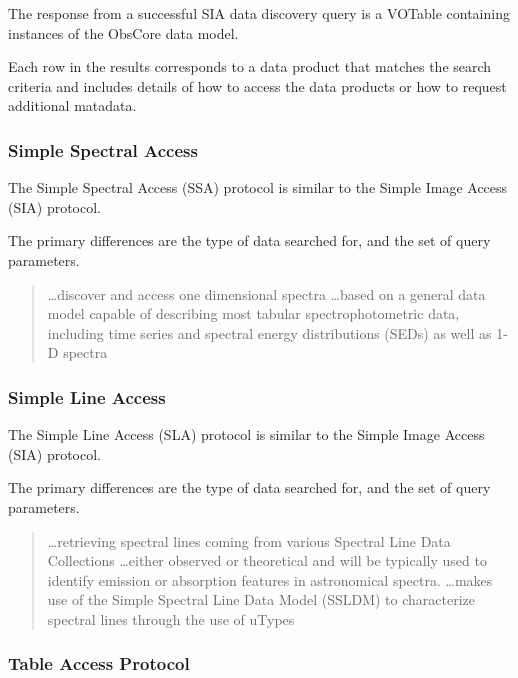 \documentclass{article}
\begin{document}
The response from a successful SIA data discovery query is a VOTable containing
instances of the ObsCore  data
model.

Each row in the results corresponds to a data product that matches the search
criteria and includes details of how to access the data products or how
to request additional matadata.

\subsubsection{Simple Spectral Access}

The Simple Spectral Access (SSA) protocol is similar to the Simple Image Access (SIA) protocol.

The primary differences are the type of data searched for, and the set of query
parameters.

\begin{quote}
\ldots discover and access one dimensional spectra
\ldots based on a general data model capable of describing most tabular
spectrophotometric data, including time series and spectral energy distributions
(SEDs) as well as 1-D spectra
\end{quote}

\subsubsection{Simple Line Access}

The Simple Line Access (SLA) protocol is similar to the Simple Image Access
(SIA) protocol.

The primary differences are the type of data searched for, and the set of query
parameters.

\begin{quote}
\ldots retrieving spectral lines coming from various Spectral Line Data
Collections
\ldots either observed or theoretical and will be typically used to identify
emission or absorption features in astronomical spectra.
\ldots makes use of the Simple Spectral Line Data Model
(SSLDM)  to characterize spectral
lines through the use of uTypes
\end{quote}
  
\subsubsection{Table Access Protocol}
\end{document}

